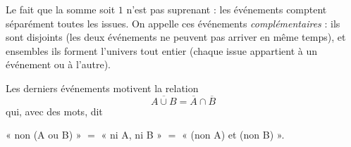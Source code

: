 {	Le fait que la somme soit $1$ n'est pas suprenant : les événements comptent séparément toutes les issues.
	On appelle ces événements \emph{complémentaires} : ils sont disjoints (les deux événements ne peuvent pas arriver en même temps), et ensembles ils forment l'univers tout entier (chaque issue appartient à un événement ou à l'autre).
	
	Les derniers événements motivent la relation 
		\[ \overline{A \cup B} = \overline{A} \cap \overline{B} \]
	qui, avec des mots, dit
		\begin{center}
			« non (A ou B) » $=$ « ni A, ni B » $=$ « (non A) et (non B) ».
		\end{center}
}





